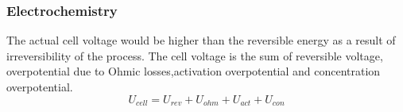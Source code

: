 \subsubsection{Electrochemistry} 
The actual cell voltage would be higher than the reversible energy  as a result of irreversibility of the process. The cell voltage is the sum of reversible voltage, overpotential due to Ohmic losses,activation overpotential and concentration overpotential.
\begin{equation} 
U_{cell}=U_{rev}+U_{ohm}+U_{act}+U_{con}
\end{equation} 


